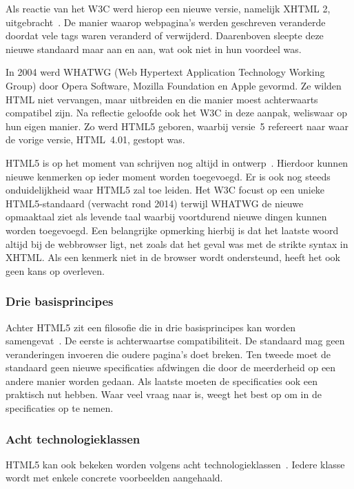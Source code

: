 Als reactie van het W3C werd hierop  een nieuwe versie, namelijk XHTML 2, uitgebracht~\cite{MacDonald2011}.
De manier waarop webpagina's werden geschreven veranderde doordat vele tags waren veranderd of verwijderd. 
Daarenboven sleepte deze nieuwe standaard maar aan en aan, wat ook niet in hun voordeel was. 

In 2004 werd WHATWG (Web Hypertext Application Technology Working Group) door Opera Software, Mozilla Foundation en Apple gevormd. 
Ze wilden HTML niet vervangen, maar uitbreiden en die manier moest achterwaarts compatibel zijn. 
Na reflectie geloofde ook het W3C in deze aanpak, weliswaar op hun eigen manier.  
Zo werd HTML5 geboren, waarbij versie~5 refereert naar waar de vorige versie, HTML~4.01, gestopt was.

HTML5 is op het moment van schrijven nog altijd in ontwerp~\cite{MacDonald2011}. 
Hierdoor kunnen nieuwe kenmerken op ieder moment worden toegevoegd.  
Er is ook nog steeds onduidelijkheid waar HTML5 zal toe leiden.  
Het W3C focust op een unieke HTML5-standaard (verwacht rond 2014) terwijl WHATWG de nieuwe opmaaktaal ziet als levende taal waarbij voortdurend  nieuwe dingen kunnen worden toegevoegd. 
Een belangrijke opmerking hierbij is dat het laatste woord altijd bij de webbrowser ligt, net zoals dat het geval was met de strikte syntax in XHTML. 
Als een kenmerk niet in de browser wordt ondersteund, heeft het ook geen kans op overleven.

\subsubsection{Drie basisprincipes}
Achter HTML5 zit een filosofie die in drie basisprincipes kan worden samengevat~\cite{MacDonald2011}.  
De eerste is achterwaartse compatibiliteit. 
De standaard mag geen veranderingen invoeren die oudere pagina's doet breken. 
Ten tweede moet de standaard geen nieuwe specificaties afdwingen die door de meerderheid op een andere manier worden gedaan. 
Als laatste moeten de specificaties ook een praktisch nut hebben. 
Waar veel vraag naar is, weegt het best op om in de specificaties op te nemen.

\subsubsection{Acht technologieklassen}
HTML5 kan ook bekeken worden volgens acht technologieklassen~\cite{W3C2012}. 
Iedere klasse wordt met enkele concrete voorbeelden aangehaald.

